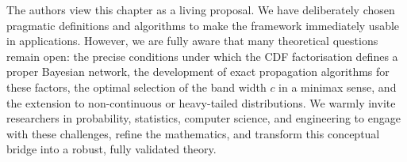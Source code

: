 \begin{remarkbox}
\begin{remarkT}
The authors view this chapter as a living proposal. We have deliberately chosen pragmatic definitions and algorithms to make the framework immediately usable in applications. However, we are fully aware that many theoretical questions remain open: the precise conditions under which the CDF factorisation defines a proper Bayesian network, the development of exact propagation algorithms for these factors, the optimal selection of the band width $c$ in a minimax sense, and the extension to non-continuous or heavy-tailed distributions. We warmly invite researchers in probability, statistics, computer science, and engineering to engage with these challenges, refine the mathematics, and transform this conceptual bridge into a robust, fully validated theory.
\end{remarkT}
\end{remarkbox} 